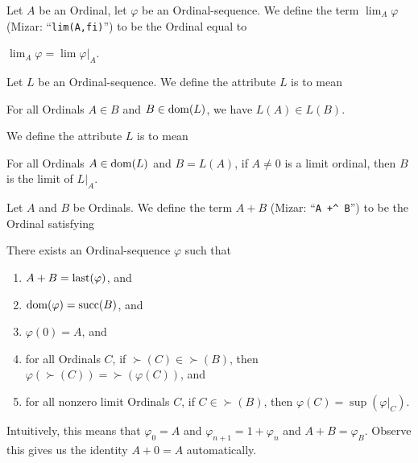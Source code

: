 \documentclass{article}
\begin{document}
\begin{definition}
Let $A$ be an Ordinal, let $\varphi$ be an Ordinal-sequence.
We define the term $\lim_{A}\varphi$ (Mizar: ``\verb#lim(A,fi)#'')
to be the Ordinal equal to
\begin{defn}
\item $\lim_{A}\varphi=\lim\varphi|_{A}$.
\end{defn}
\end{definition}

\begin{definition}
Let $L$ be an Ordinal-sequence.
We define the attribute $L$ is  to mean
\begin{defn}
\item For all Ordinals $A\in B$ and $B\in\operatorname{dom}(L)$, we have $L(A)\in L(B)$.
\end{defn}
We define the attribute $L$ is  to mean
\begin{defn}
\item For all Ordinals $A\in\operatorname{dom}(L)$ and $B=L(A)$, if $A\neq 0$ is a
  limit ordinal, then $B$ is the limit of $L|_{A}$.
\end{defn}
\end{definition}

\begin{definition}
Let $A$ and $B$ be Ordinals.
We define the term $A+B$ (Mizar: ``\verb#A +^ B#'') to be the Ordinal
satisfying
\begin{defn}
\item There exists an Ordinal-sequence $\varphi$ such that
  \begin{enumerate}[label=(\roman*)]
  \item $A+B=\operatorname{last}(\varphi)$, and
  \item $\operatorname{dom}(\varphi)=\operatorname{succ}(B)$, and
  \item $\varphi(0)=A$, and
  \item for all Ordinals $C$, if $\succ(C)\in\succ(B)$, then $\varphi(\succ(C))=\succ(\varphi(C))$,
    and
  \item for all nonzero limit Ordinals $C$, if $C\in\succ(B)$, then $\varphi(C)=\sup(\varphi|_{C})$.
  \end{enumerate}
\end{defn}
\end{definition}

\begin{remark}
Intuitively, this means that $\varphi_{0}=A$ and $\varphi_{n+1}=1+\varphi_{n}$
and $A+B=\varphi_{B}$. Observe this gives us the identity $A+0=A$ automatically.
\end{remark}
\end{document}
